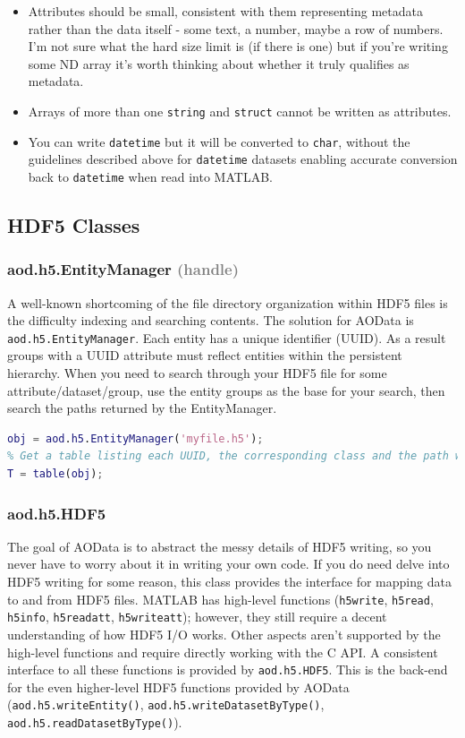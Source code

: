 \documentclass[10pt]{exam}
\newcommand\myparent[1]{\textcolor{gray}{(#1)}}
\newcommand\aodclass[1]{\textcolor{codeblue}{\texttt{#1}}}
\newcommand\matclass[1]{\textcolor{codeblue}{\texttt{#1}}}
\newcommand\aodfcn[1]{\textcolor{darkteal}{\texttt{#1}}}
\newcommand\matfcn[1]{\textcolor{darkteal}{\texttt{#1}}}
\begin{document}
\begin{itemize}
			\begin{itemize}
				\item Attributes should be small, consistent with them representing metadata rather than the data itself - some text, a number, maybe a row of numbers. I'm not sure what the hard size limit is (if there is one) but if you're writing some ND array it's worth thinking about whether it truly qualifies as metadata.
				\item Arrays of more than one \matclass{string} and \matclass{struct} cannot be written as attributes.
				\item You can write \matclass{datetime} but it will be converted to \matclass{char}, without the guidelines described above for \matclass{datetime} datasets enabling accurate conversion back to \matclass{datetime} when read into MATLAB.
			\end{itemize}
		\end{itemize}

\subsection{HDF5 Classes}
	\subsubsection{aod.h5.EntityManager \myparent{handle}}\label{subsubsection:EntityManager}
		\noindent A well-known shortcoming of the file directory organization within HDF5 files is the difficulty indexing and searching contents. The solution for AOData is \aodclass{aod.h5.EntityManager}. Each entity has a unique identifier (UUID). As a result groups with a UUID attribute must reflect entities within the persistent hierarchy. When you need to search through your HDF5 file for some attribute/dataset/group, use the entity groups as the base for your search, then search the paths returned by the EntityManager.
	\begin{lstlisting}[language=matlab]
obj = aod.h5.EntityManager('myfile.h5');
% Get a table listing each UUID, the corresponding class and the path within the HDF5 file
T = table(obj);
	\end{lstlisting}
	\subsubsection{aod.h5.HDF5}
		\noindent The goal of AOData is to abstract the messy details of HDF5 writing, so you never have to worry about it in writing your own code. If you do need delve into HDF5 writing for some reason, this class provides the interface for mapping data to and from HDF5 files. MATLAB has high-level functions (\matfcn{h5write}, \matfcn{h5read}, \matfcn{h5info}, \matfcn{h5readatt}, \matfcn{h5writeatt}); however, they still require a decent understanding of how HDF5 I/O works. Other aspects aren't supported by the high-level functions and require directly working with the C API. A consistent interface to all these functions is provided by \aodclass{aod.h5.HDF5}. This is the back-end for the even higher-level HDF5 functions provided by AOData (\aodfcn{aod.h5.writeEntity()}, \aodfcn{aod.h5.writeDatasetByType()}, \aodfcn{aod.h5.readDatasetByType()}).
		
\end{document}
